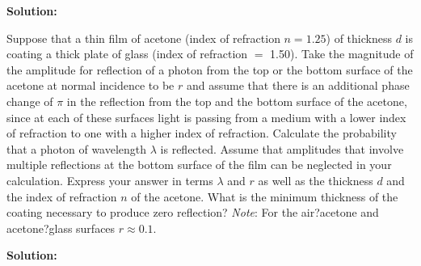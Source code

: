 \documentclass[11pt]{article}
\begin{document}
\textbf{Solution:}\\

\clearpage

\begin{problem}[Townsend (P1.25)*]
Suppose that a thin film of acetone (index of refraction $n = 1.25$) of thickness $d$ is coating a thick
plate of glass (index of refraction $=$ 1.50). Take the magnitude of the amplitude for reflection of a
photon from the top or the bottom surface of the acetone at normal incidence to be $r$ and assume
that there is an additional phase change of $\pi$ in the reflection from the top and the bottom surface
of the acetone, since at each of these surfaces light is passing from a medium with a lower index
of refraction to one with a higher index of refraction. Calculate the probability that a photon of
wavelength $\lambda$ is reflected. Assume that amplitudes that involve multiple reflections at the bottom
surface of the film can be neglected in your calculation. Express your answer in terms $\lambda$ and $r$ as
well as the thickness $d$ and the index of refraction $n$ of the acetone. What is the minimum thickness
of the coating necessary to produce zero reflection? \textit{Note}: For the air?acetone and acetone?glass
surfaces $r \approx 0.1$.
\end{problem}


\textbf{Solution:}\\

\clearpage
\end{document}
